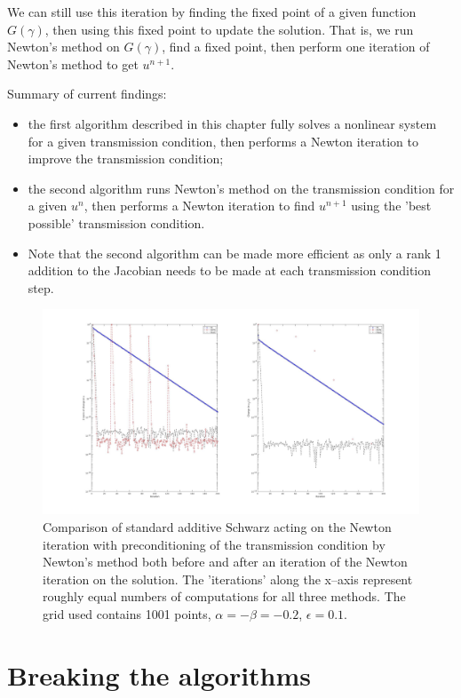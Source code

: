 \documentclass{book}
\begin{document}
We can still use this iteration by finding the fixed point of a given function $G(\gamma)$, then using this fixed point to update the solution.
That is, we run Newton's method on $G(\gamma)$, find a fixed point, then perform one iteration of Newton's method to get $u^{n+1}$.

Summary of current findings:
\begin{itemize}
\item the first algorithm described in this chapter fully solves a nonlinear system for a given transmission condition, then performs a Newton iteration to improve the transmission condition;
\item the second algorithm runs Newton's method on the transmission condition for a given $u^n$, then performs a Newton iteration to find $u^{n+1}$ using the 'best possible' transmission condition.
\item Note that the second algorithm can be made more efficient as only a rank 1 addition to the Jacobian needs to be made at each transmission condition step.
\end{itemize}

\begin{figure}
	\includegraphics[width=\textwidth]{exp7_01.jpg}
	\caption{Comparison of standard additive Schwarz acting on the Newton iteration with preconditioning of the transmission condition by Newton's method both before and after an iteration of the Newton iteration on the solution. The 'iterations' along the x--axis represent roughly equal numbers of computations for all three methods. The grid used contains 1001 points, $\alpha = -\beta = -0.2$, $\epsilon = 0.1$.}
	\label{fig:ASPN}
\end{figure}

\section{Breaking the algorithms}
\end{document}
